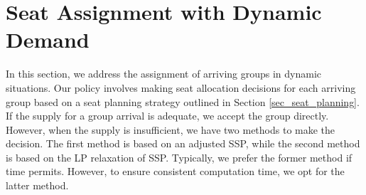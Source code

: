 \section{Seat Assignment with Dynamic Demand}\label{sec_dynamic}



In this section, we address the assignment of arriving groups in dynamic situations. Our policy involves making seat allocation decisions for each arriving group based on a seat planning strategy outlined in Section \ref{sec_seat_planning}. If the supply for a group arrival is adequate, we accept the group directly. However, when the supply is insufficient, we have two methods to make the decision. The first method is based on an adjusted SSP, while the second method is based on the LP relaxation of SSP. Typically, we prefer the former method if time permits. However, to ensure consistent computation time, we opt for the latter method.






